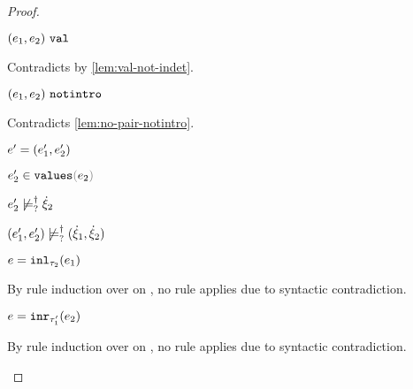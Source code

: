 \begin{proof}
\begin{byCases}
\begin{byCases}
\begin{byCases}
\begin{byCases}
\begin{byCases}
\begin{pfsteps*}
            \item $(e_1 , e_2) ~\mathtt{val}$ 
            \end{pfsteps*} 
            Contradicts  by \autoref{lem:val-not-indet}.
            \item[\text{(\ref{rule:IVIndet})}] 
            \begin{pfsteps*}
            \item $(e_1 , e_2) ~\mathtt{notintro}$ 
            \end{pfsteps*}
            Contradicts \autoref{lem:no-pair-notintro}.
            \item[\text{(\ref{rule:IVPair})}]
            \begin{pfsteps*}
            \item $e'=(e_1' , e_2')$ 
            \item $\inValues{e_2'}{e_2}$  
            \item $e_2' \not\models_{?}^{\dag} \dot{\xi}_2$  
            \item $(e_1' , e_2') \not\models_{?}^{\dag} (\dot{\xi}_1 , \dot{\xi}_2)$ 
            \end{pfsteps*} 
          \end{byCases}
        \end{byCases}
      \end{byCases}
      \item[\text{(\ref{rule:IInl})}] 
      \begin{pfsteps*}
      \item $e=\mathtt{inl}_{\tau_2}({e_1})$ 
      \end{pfsteps*} 
      By rule induction over  on , no rule applies due to syntactic contradiction.
      \item[\text{(\ref{rule:IInr})}] 
      \begin{pfsteps*}
      \item $e=\mathtt{inr}_{\tau_1'}({e_2})$ 
      \end{pfsteps*} 
      By rule induction over  on , no rule applies due to syntactic contradiction.
    \end{byCases}

\end{byCases}
\end{proof}

